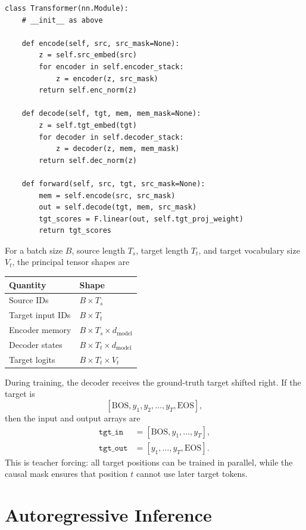 \documentclass[11pt]{article}
\begin{document}
\begin{lstlisting}[caption={Encoding, decoding, and teacher-forced forward pass.},label={lst:transformer_forward}]
class Transformer(nn.Module):
    # __init__ as above

    def encode(self, src, src_mask=None):
        z = self.src_embed(src)
        for encoder in self.encoder_stack:
            z = encoder(z, src_mask)
        return self.enc_norm(z)

    def decode(self, tgt, mem, mem_mask=None):
        z = self.tgt_embed(tgt)
        for decoder in self.decoder_stack:
            z = decoder(z, mem, mem_mask)
        return self.dec_norm(z)

    def forward(self, src, tgt, src_mask=None):
        mem = self.encode(src, src_mask)
        out = self.decode(tgt, mem, src_mask)
        tgt_scores = F.linear(out, self.tgt_proj_weight)
        return tgt_scores
\end{lstlisting}

For a batch size $B$, source length $T_s$, target length $T_t$, and target vocabulary size $V_t$, the principal tensor shapes are
\begin{center}
\begin{tabular}{@{}ll@{}}
\toprule
Quantity & Shape \\
\midrule
Source IDs & $B\times T_s$ \\
Target input IDs & $B\times T_t$ \\
Encoder memory & $B\times T_s\times d_{\mathrm{model}}$ \\
Decoder states & $B\times T_t\times d_{\mathrm{model}}$ \\
Target logits & $B\times T_t\times V_t$ \\
\bottomrule
\end{tabular}
\end{center}

During training, the decoder receives the ground-truth target shifted right. If the target is
\[
  [\mathrm{BOS},y_1,y_2,\ldots,y_T,\mathrm{EOS}],
\]
then the input and output arrays are
\begin{align}
  \texttt{tgt\_in}  &= [\mathrm{BOS},y_1,\ldots,y_T],\\
  \texttt{tgt\_out} &= [y_1,\ldots,y_T,\mathrm{EOS}].
\end{align}
This is teacher forcing: all target positions can be trained in parallel, while the causal mask ensures that position $t$ cannot use later target tokens.

\section{Autoregressive Inference}
\label{sec:inference}
\end{document}
